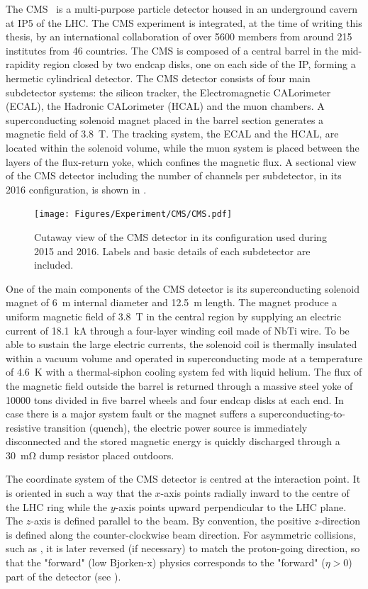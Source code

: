 The CMS~\cite{CMS} is a multi-purpose particle detector housed in an underground cavern at IP5 of the LHC. The CMS experiment is integrated, at the time of writing this thesis, by an international collaboration of over 5600 members from around 215 institutes from 46 countries. The CMS is composed of a central barrel in the mid-rapidity region closed by two endcap disks, one on each side of the IP, forming a hermetic cylindrical detector. The CMS detector consists of four main subdetector systems: the silicon tracker, the Electromagnetic CALorimeter (ECAL), the Hadronic CALorimeter (HCAL) and the muon chambers. A superconducting solenoid magnet placed in the barrel section generates a magnetic field of \SI{3.8}{\tesla}. The tracking system, the ECAL and the HCAL, are located within the solenoid volume, while the muon system is placed between the layers of the flux-return yoke, which confines the magnetic flux. A sectional view of the CMS detector including the number of channels per subdetector, in its 2016 configuration, is shown in .

\begin{figure}[!htbp]
 \centering
 \texttt{[image: Figures/Experiment/CMS/CMS.pdf]}
 \caption{Cutaway view of the CMS detector in its configuration used during 2015 and 2016. Labels and basic details of each subdetector are included.~\cite{CMSLayout} }
 \label{fig:CMS2016}
\end{figure}

One of the main components of the CMS detector is its superconducting solenoid magnet of \SI{6}{\m} internal diameter and \SI{12.5}{\m} length. The magnet produce a uniform magnetic field of \SI{3.8}{\tesla} in the central region by supplying an electric current of \SI{18.1}{\kA} through a four-layer winding coil made of NbTi wire. To be able to sustain the large electric currents, the solenoid coil is thermally insulated within a vacuum volume and operated in superconducting mode at a temperature of \SI{4.6}{\K} with a thermal-siphon cooling system fed with liquid helium. The flux of the magnetic field outside the barrel is returned through a massive steel yoke of 10000 tons divided in five barrel wheels and four endcap disks at each end. In case there is a major system fault or the magnet suffers a superconducting-to-resistive transition (quench), the electric power source is immediately disconnected and the stored magnetic energy is quickly discharged through a \SI{30}{\mohm} dump resistor placed outdoors.

The coordinate system of the CMS detector is centred at the interaction point. It is oriented in such a way that the $x$-axis points radially inward to the centre of the LHC ring while the $y$-axis points upward perpendicular to the LHC plane. The $z$-axis is defined parallel to the beam. By convention, the positive $z$-direction is defined along the counter-clockwise beam direction. For asymmetric collisions, such as \RunpPb, it is later reversed (if necessary) to match the proton-going direction, so that the "forward" (low Bjorken-x) physics corresponds to the "forward" ($\eta > 0$) part of the detector (see ).

